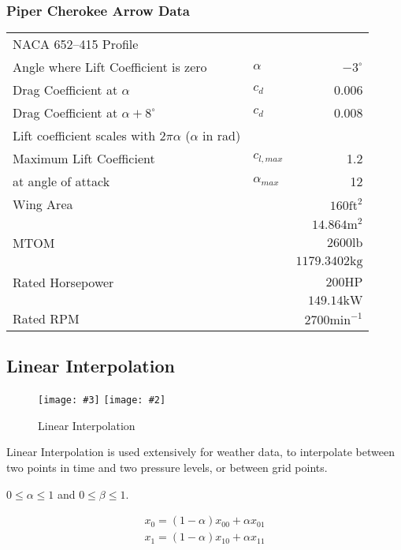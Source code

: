 \documentclass[a4paper,10pt,pdftex]{article}
\newcommand{\jnxfig}[3][]{\ifmypdf\texttt{[image: \#3]}
  \else\texttt{[image: \#2]}\fi}
\begin{document}
\subsubsection{Piper Cherokee Arrow Data}

\noindent\begin{tabular}{llr}
  NACA 652--415 Profile & & \\
  Angle where Lift Coefficient is zero & $\alpha$ & $-3^\circ$ \\
  Drag Coefficient at $\alpha$ & $c_d$ & 0.006 \\
  Drag Coefficient at $\alpha+8^\circ$ & $c_d$ & 0.008 \\
  Lift coefficient scales with $2\pi\alpha$ ($\alpha$ in rad) & & \\
  Maximum Lift Coefficient & $c_{l,max}$ & 1.2 \\
  at angle of attack & $\alpha_{max}$ & 12 \\
  Wing Area & & $160\mathrm{ft}^2$ \\
  & & $14.864\mathrm{m}^2$ \\
  MTOM & & $2600\mathrm{lb}$ \\
  & & $1179.3402\mathrm{kg}$ \\
  Rated Horsepower & & $200\mathrm{HP}$ \\
  & & $149.14\mathrm{kW}$ \\
  Rated RPM & & $2700\mathrm{min}^{-1}$ \\
\end{tabular}

\fi

\subsection{Linear Interpolation}

\noindent\begin{figure}[!htbp]
  \begin{center}
    \jnxfig[scale=0.7]{lininterp.eps}{lininterp.pdf}
    \caption{Linear Interpolation}
    \label{fig:lininterp}
  \end{center}
\end{figure}

Linear Interpolation is used extensively for weather data, to
interpolate between two points in time and two pressure levels, or
between grid points.

$0\leq\alpha\leq{}1$ and $0\leq\beta\leq{}1$.

\begin{eqnarray}
  x_0 = (1-\alpha)x_{00} + \alpha x_{01} \\
  x_1 = (1-\alpha)x_{10} + \alpha x_{11}
\end{eqnarray}
\end{document}
